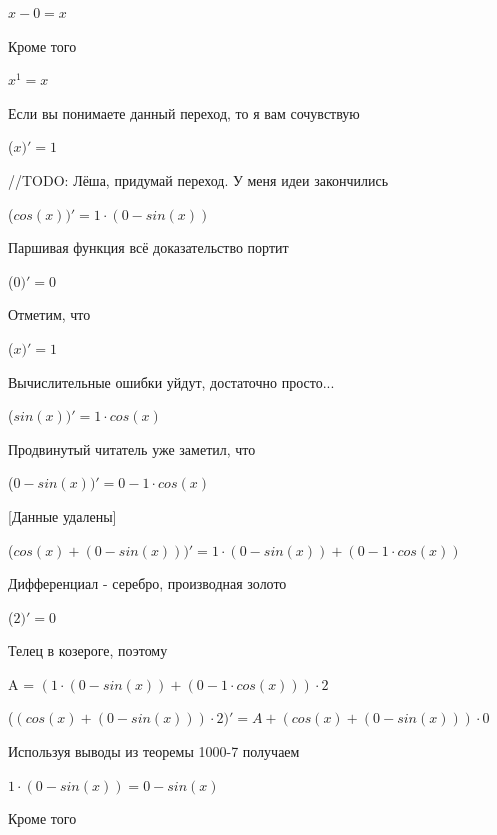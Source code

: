 \documentclass[12pt,a4paper,fleqn]{article}
\begin{document}
\begin{center}
$x-0 = x$\end{center}
Кроме того

\begin{center}
$x^{1} = x$\end{center}
Если вы понимаете данный переход, то я вам сочувствую

\begin{center}
 ($x)'
  = 1$\end{center}
//TODO: Лёша, придумай переход. У меня идеи закончились

\begin{center}
 ($cos(x))'
  = 1 \cdot (0-sin(x))$\end{center}
Паршивая функция всё доказательство портит\cite{link2}

\begin{center}
 ($0)'
  = 0$\end{center}
Отметим, что

\begin{center}
 ($x)'
  = 1$\end{center}
Вычислительные ошибки уйдут, достаточно просто...

\begin{center}
 ($sin(x))'
  = 1 \cdot cos(x)$\end{center}
Продвинутый читатель уже заметил, что

\begin{center}
 ($0-sin(x))'
  = 0-1 \cdot cos(x)$\end{center}
[Данные удалены]

\begin{center}
 ($cos(x)+(0-sin(x)))'
  = 1 \cdot (0-sin(x))+(0-1 \cdot cos(x))$\end{center}
Дифференциал - серебро, производная золото\cite{link2}

\begin{center}
 ($2)'
  = 0$\end{center}
Телец в козероге, поэтому

\begin{center}
A = $(1 \cdot (0-sin(x))+(0-1 \cdot cos(x))) \cdot 2$\end{center}
\begin{center}
 ($(cos(x)+(0-sin(x))) \cdot 2)'
  = A+(cos(x)+(0-sin(x))) \cdot 0$\end{center}
Используя выводы из теоремы 1000-7 получаем

\begin{center}
$1 \cdot (0-sin(x)) = 0-sin(x)$\end{center}
Кроме того
\end{document}
